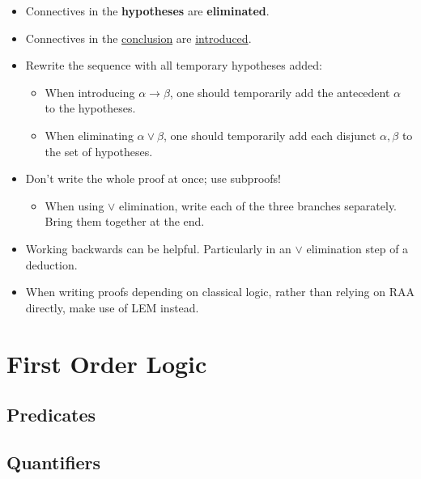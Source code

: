 \documentclass{book}
\begin{document}
        \begin{itemize}
            \item Connectives in the {\bf hypotheses} are {\bf eliminated}.            
            \item Connectives in the \underline{conclusion} are \underline{introduced}. 
            \item Rewrite the sequence with all temporary hypotheses added:
                \begin{itemize}
                    \item When introducing $\alpha \to \beta$, one should temporarily add the antecedent $\alpha$ to the hypotheses.
                    \item When eliminating $\alpha \lor \beta$, one should temporarily add each disjunct $\alpha, \beta$ to the set of hypotheses.
                \end{itemize}
            \item Don't write the whole proof at once; use subproofs! 
                \begin{itemize}
                    \item When using $\lor$ elimination, write each of the three branches separately. Bring them together at the end.
                \end{itemize}
            \item Working backwards can be helpful. Particularly in an $\lor$ elimination step of a deduction. 
            \item When writing proofs depending on classical logic, rather than relying on RAA directly, make use of LEM instead.            
        \end{itemize}

    \newpage
    \section{First Order Logic}
    
        \subsection{Predicates}



        \subsection{Quantifiers}
\end{document}
